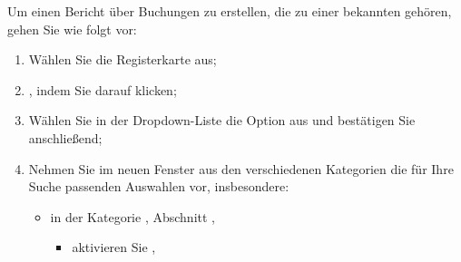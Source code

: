 Um einen Bericht über Buchungen zu erstellen, die zu einer bekannten  gehören, gehen Sie wie folgt vor:
\begin{enumerate}
	\item Wählen Sie die Registerkarte  aus;
	\item {}, indem Sie darauf klicken;
	\item Wählen Sie in der Dropdown-Liste  die Option  aus und bestätigen Sie anschließend;
	\item Nehmen Sie im neuen Fenster  aus den verschiedenen Kategorien die für Ihre Suche passenden Auswahlen vor, insbesondere:
	\begin{itemize}
		\item in der Kategorie , Abschnitt ,
		\begin{itemize}
			\item aktivieren Sie ,

\end{itemize}
\end{itemize}
\end{enumerate}
